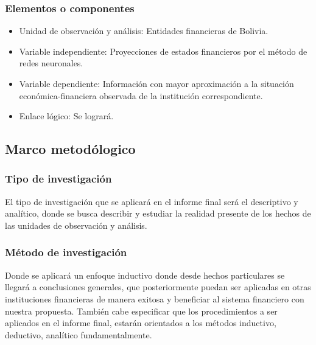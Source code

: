 \documentclass[
  12pt,
]{article}
\providecommand{\tightlist}{%
  \setlength{\itemsep}{0pt}\setlength{\parskip}{0pt}}
\begin{document}
\hypertarget{elementos-o-componentes}{%
\subsubsection{Elementos o componentes}\label{elementos-o-componentes}}

\begin{itemize}
\tightlist
\item
  Unidad de observación y análisis: Entidades financieras de Bolivia.
\item
  Variable independiente: Proyecciones de estados financieros por el
  método de redes neuronales.
\item
  Variable dependiente: Información con mayor aproximación a la
  situación económica-financiera observada de la institución
  correspondiente.
\item
  Enlace lógico: Se logrará.
\end{itemize}

\hypertarget{marco-metoduxf3logico}{%
\subsection{Marco metodólogico}\label{marco-metoduxf3logico}}

\hypertarget{tipo-de-investigaciuxf3n}{%
\subsubsection{Tipo de investigación}\label{tipo-de-investigaciuxf3n}}

El tipo de investigación que se aplicará en el informe final será el
descriptivo y analítico, donde se busca describir y estudiar la realidad
presente de los hechos de las unidades de observación y análisis.

\hypertarget{muxe9todo-de-investigaciuxf3n}{%
\subsubsection{Método de
investigación}\label{muxe9todo-de-investigaciuxf3n}}

Donde se aplicará un enfoque inductivo donde desde hechos particulares
se llegará a conclusiones generales, que posteriormente puedan ser
aplicadas en otras instituciones financieras de manera exitosa y
beneficiar al sistema financiero con nuestra propuesta. También cabe
especificar que los procedimientos a ser aplicados en el informe final,
estarán orientados a los métodos inductivo, deductivo, analítico
fundamentalmente.
\end{document}
